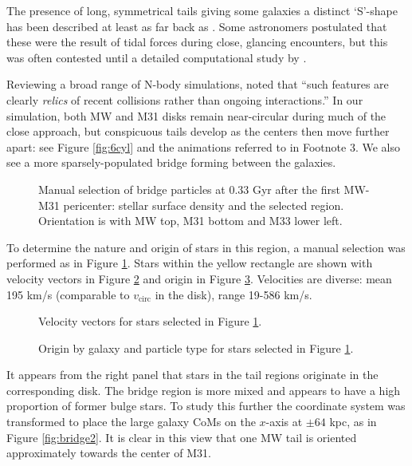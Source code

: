 \documentclass[twocolumn]{aastex63}
\begin{document}
The presence of long, symmetrical tails giving some galaxies a distinct `S'-shape has been described at least as far back as \citet{zwicky_novel_1955}. Some astronomers postulated that these were the result of tidal forces during close, glancing encounters, but this was often contested until a detailed computational study by \citet{toomre_galactic_1972}.

Reviewing a broad range of N-body simulations, \citet{barnes_dynamics_1992} noted that ``such features are clearly \textit{relics} of recent collisions rather than ongoing interactions.'' In our simulation, both MW and M31 disks remain near-circular during much of the close approach, but conspicuous tails develop as the centers then move further apart: see Figure \ref{fig:6cyl} and the animations referred to in Footnote 3. We also see a more sparsely-populated bridge forming between the galaxies.

\begin{figure}[ht!]
	\caption{Manual selection of bridge particles at 0.33 Gyr after the first MW-M31 pericenter: stellar surface density and the selected region. Orientation is with MW top, M31 bottom and M33 lower left. 
	\label{fig:bridge_a}}
\end{figure}

To determine the nature and origin of stars in this region, a manual selection was performed as in Figure \ref{fig:bridge_a}. Stars within the yellow rectangle are shown with velocity vectors in Figure \ref{fig:bridge_b} and origin in Figure \ref{fig:bridge_c}. Velocities are diverse: mean 195 km/s (comparable to $v_{\text{circ}}$ in the disk), range 19-586 km/s. 

\begin{figure}[ht!]
	\caption{Velocity vectors for stars selected in Figure \ref{fig:bridge_a}. 
		\label{fig:bridge_b}}
\end{figure}

\begin{figure}[ht!]
	\caption{Origin by galaxy and particle type for stars selected in Figure \ref{fig:bridge_a}.
		\label{fig:bridge_c}}
\end{figure}

It appears from the right panel that stars in the tail regions originate in the corresponding disk. The bridge region is more mixed and appears to have a high proportion of former bulge stars. To study this further the coordinate system was transformed to place the large galaxy CoMs on the $x$-axis at $\pm 64$ kpc, as in Figure \ref{fig:bridge2}. It is clear in this view that one MW tail is oriented approximately towards the center of M31. 
\end{document}
